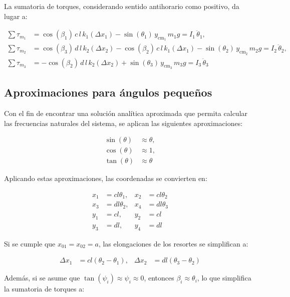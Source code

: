 La sumatoria de torques, considerando sentido antihorario como positivo, da lugar a:

\begin{align*}
\sum \tau_{m_1} &= \cos(\beta_1) \, c \, l \, k_1 (\Delta x_1) - \sin(\theta_1) \, y_{\text{cm}_1} \, m_1 g = I_1 \, \ddot{\theta}_1, \\
\sum \tau_{m_2} &= \cos(\beta_3) \, d \, l \, k_2 (\Delta x_2) - \cos(\beta_2) \, c \, l \, k_1 (\Delta x_1) - \sin(\theta_2) \, y_{\text{cm}_2} \, m_2 g = I_2 \, \ddot{\theta}_2, \\
\sum \tau_{m_3} &= -\cos(\beta_2) \, d \, l \, k_2 (\Delta x_2) + \sin(\theta_3) \, y_{\text{cm}_3} \, m_3 g = I_3 \, \ddot{\theta}_3
\end{align*}

\subsection*{Aproximaciones para ángulos pequeños}

Con el fin de encontrar una solución analítica aproximada que permita calcular las frecuencias naturales del sistema, se aplican las siguientes aproximaciones:

\begin{align*}
    \sin(\theta) &\approx \theta, \\
    \cos(\theta) &\approx 1, \\
    \tan(\theta) &\approx \theta
\end{align*}

Aplicando estas aproximaciones, las coordenadas se convierten en:

\begin{align*}
x_1 &= c l \theta_1, & x_2 &= c l \theta_2 \\
x_3 &= d l \theta_2, & x_4 &= d l \theta_3 \\
y_1 &= c l, & y_2 &= c l \\
y_3 &= d l, & y_4 &= d l
\end{align*}

Si se cumple que \(x_{01} = x_{02} = a\), las elongaciones de los resortes se simplifican a:

\begin{align*}
\Delta x_1 &= cl(\theta_2 - \theta_1), & \Delta x_2 &= dl(\theta_3 - \theta_2)
\end{align*}

Además, si se asume que \(\tan(\psi_i) \approx \psi_i \approx 0\), entonces \(\beta_i \approx \theta_i\), lo que simplifica la sumatoria de torques a:

